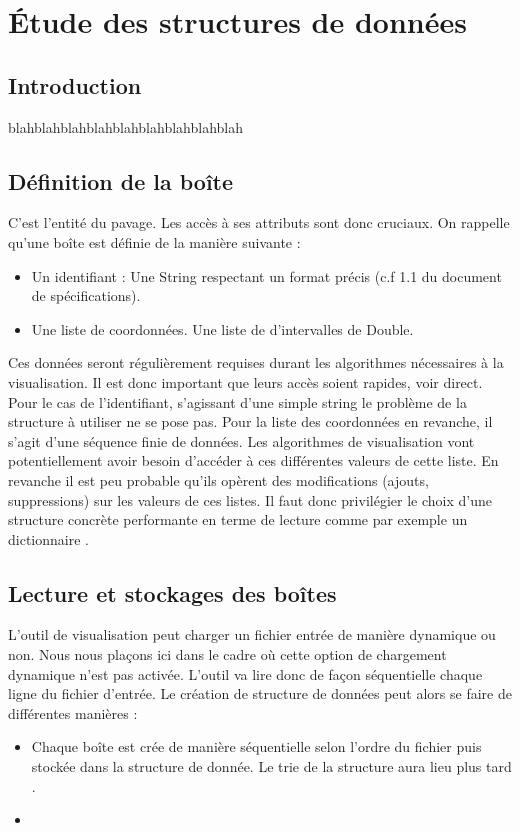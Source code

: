 \chapter{Étude des structures de données}

\section{Introduction}
 blahblahblahblahblahblahblahblahblah
\section{Définition de la boîte}
C'est l'entité du pavage. Les accès à ses attributs sont donc cruciaux. On rappelle qu'une boîte est définie de la manière suivante : 
\begin{itemize}
 \item 
Un identifiant : Une String respectant un format précis (c.f 1.1 du document de spécifications).
\item
Une liste de coordonnées. Une liste de d'intervalles de Double.
\end{itemize}
Ces données seront régulièrement requises durant les algorithmes nécessaires à la visualisation. Il est donc important que leurs accès soient rapides, voir direct. Pour le cas de l'identifiant, s'agissant d'une simple string le problème de la structure à utiliser ne se pose pas. Pour la liste des coordonnées en revanche, il s'agit d'une séquence finie de données. Les algorithmes  de visualisation vont potentiellement avoir besoin d'accéder à ces différentes valeurs de cette liste. En revanche il est peu probable qu'ils opèrent des modifications (ajouts, suppressions) sur les valeurs de ces listes. Il faut donc privilégier le choix d'une structure concrète performante en terme de lecture comme par exemple un dictionnaire .

\section{Lecture et stockages des boîtes}
L'outil de visualisation peut charger un fichier entrée de manière dynamique ou non. Nous nous plaçons ici dans le cadre où cette option de chargement dynamique n'est pas activée. L'outil va lire donc de façon séquentielle chaque ligne du fichier d'entrée. Le création de structure de  données peut alors se faire de différentes  manières : 
\begin{itemize}
 \item 
Chaque boîte est crée de manière séquentielle selon l'ordre du fichier puis stockée dans la structure de donnée. Le trie de la structure aura lieu plus tard .
\item

\end{itemize}
  



